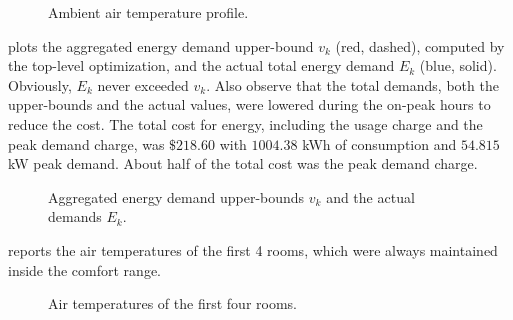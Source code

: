 \begin{figure}[tb]
  \centering
  
   \vspace{-12pt}
  \caption{Ambient air temperature profile.}
   \vspace{-6pt}
  \label{fig:simulation:ambient}
\end{figure}

 plots the aggregated energy demand upper-bound $v_{k}$ (red, dashed), computed by the top-level optimization, and the actual total energy demand $E_{k}$ (blue, solid).
Obviously, %
$E_{k}$ never exceeded %
$v_{k}$. %
Also observe that the total demands, both the upper-bounds and the actual values, were lowered during the on-peak hours to reduce the cost.
The total cost for energy, including the usage charge and the peak demand charge, was $\$218.60$ with $1004.38$ kWh of consumption and $54.815$ kW peak demand.
About half of the total cost was the peak demand charge.

\begin{figure}[tb]
  \centering
  
 \vspace{-12pt}
  \caption{Aggregated energy demand upper-bounds $v_{k}$ %
    and the actual demands $E_{k}$.}
    \vspace{-10pt}
  \label{fig:simulation:demand}
\end{figure}


 reports the air temperatures of the first 4 rooms,
which were always maintained inside the %
comfort range.

\begin{figure}[tb]
  \centering
  \vspace{-10pt}
  
  \vspace{-12pt}
  \caption{Air temperatures of the first four rooms.}
  \label{fig:simulation:temp}
\end{figure}



